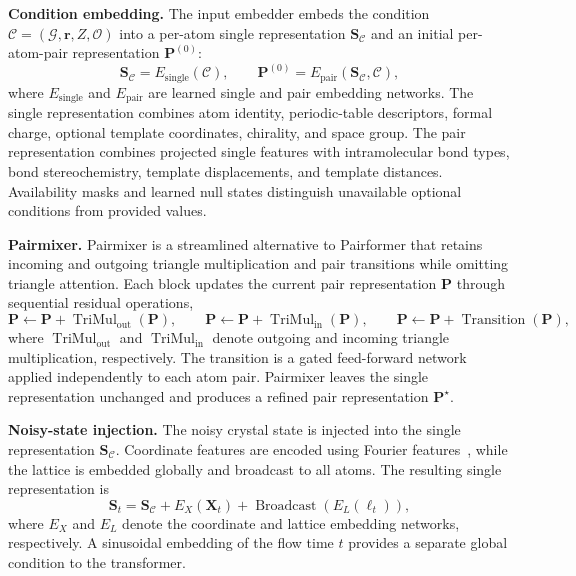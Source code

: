 

\textbf{Condition embedding.}
The input embedder embeds the condition
$\mathcal{C}=(\mathcal{G},\mathbf{r},Z,\mathcal{O})$ into a per-atom single
representation $\mathbf{S}_{\mathcal C}$ and an initial per-atom-pair
representation $\mathbf{P}^{(0)}$:
\begin{equation*}
\mathbf{S}_{\mathcal C}=E_{\mathrm{single}}(\mathcal C),
\qquad
\mathbf{P}^{(0)}=E_{\mathrm{pair}}(\mathbf{S}_{\mathcal C},\mathcal C),
\end{equation*}
where $E_{\mathrm{single}}$ and $E_{\mathrm{pair}}$ are learned single and pair
embedding networks. The single representation combines atom identity,
periodic-table descriptors, formal charge, optional template coordinates,
chirality, and space group. The pair representation combines projected single
features with intramolecular bond types, bond stereochemistry, template
displacements, and template distances. Availability masks and learned null states
distinguish unavailable optional conditions from provided values.

\textbf{Pairmixer.}
Pairmixer is a streamlined alternative to Pairformer that retains incoming and
outgoing triangle multiplication and pair transitions while omitting triangle
attention. Each block updates the current pair representation $\mathbf{P}$ through
sequential residual operations,
\begin{equation*}
\mathbf{P}\leftarrow\mathbf{P}
+\operatorname{TriMul}_{\mathrm{out}}(\mathbf{P}),\qquad
\mathbf{P}\leftarrow\mathbf{P}
+\operatorname{TriMul}_{\mathrm{in}}(\mathbf{P}),\qquad
\mathbf{P}\leftarrow\mathbf{P}
+\operatorname{Transition}(\mathbf{P}),
\end{equation*}
where $\operatorname{TriMul}_{\mathrm{out}}$ and
$\operatorname{TriMul}_{\mathrm{in}}$ denote outgoing and incoming triangle
multiplication, respectively. The transition is a gated feed-forward network
applied independently to each atom pair. Pairmixer leaves the single representation unchanged and produces a refined pair representation $\mathbf{P}^{\star}$.

\textbf{Noisy-state injection.}
The noisy crystal state is injected into the single representation
$\mathbf{S}_{\mathcal C}$. Coordinate features are encoded using Fourier features~\citep{tancik2020fourier}, while the lattice is embedded
globally and broadcast to all atoms. The resulting single representation is
\begin{equation*}
\mathbf{S}_t
=\mathbf{S}_{\mathcal C}
+E_X(\mathbf{X}_t)
+\operatorname{Broadcast}\!\left(E_L(\boldsymbol{\ell}_t)\right),
\end{equation*}
where $E_X$ and $E_L$ denote the coordinate and lattice embedding networks,
respectively. A sinusoidal embedding of the flow time $t$ provides a separate
global condition to the transformer.

